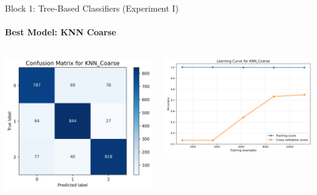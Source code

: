 \documentclass[9pt]{beamer}
\begin{document}
    \begin{frame}{Block 1: Tree-Based Classifiers (Experiment I)}
    \framesubtitle{Best Model: KNN Coarse}
    \begin{columns}
        \begin{column}{0.33\textwidth}
            \centering
            \includegraphics[width=\textwidth]{code/ResultsMainAugZip/plots/Block1_Tree_Based_Experiment_I/confusion_matrix_KNN_Coarse.png}
        \end{column}
        \begin{column}{0.33\textwidth}
            \centering
            \includegraphics[width=\textwidth]{code/ResultsMainAugZip/plots/Block1_Tree_Based_Experiment_I/learning_curve_KNN_Coarse.png}

\end{column}
\end{columns}
\end{frame}
\end{document}
